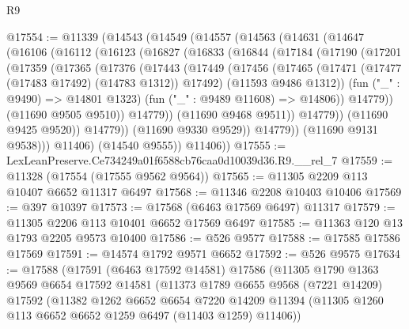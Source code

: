 \begin{lexlean}{R9}
\begin{coremodule}
@17554 := @11339
    (@14543
      (@14549
        (@14557
          (@14563
            (@14631
              (@14647
                (@16106
                  (@16112
                    (@16123
                      (@16827
                        (@16833
                          (@16844
                            (@17184
                              (@17190
                                (@17201
                                  (@17359
                                    (@17365
                                      (@17376
                                        (@17443
                                          (@17449
                                            (@17456
                                              (@17465
                                                (@17471
                                                  (@17477 (@17483 @17492) (@14783 @1312))
                                                  @17492)
                                                (@11593 @9486 @1312))
                                              (fun ("_" : @9490) => @14801 @1323)
                                              (fun ("_" : @9489 @11608) => @14806))
                                            @14779))
                                        (@11690 @9505 @9510))
                                      @14779))
                                  (@11690 @9468 @9511))
                                @14779))
                            (@11690 @9425 @9520))
                          @14779))
                      (@11690 @9330 @9529))
                    @14779))
                (@11690 @9131 @9538)))
            @11406)
          (@14540 @9555))
        @11406))
@17555 := LexLeanPreserve.Ce734249a01f6588cb76caa0d10039d36.R9.__rel_7
@17559 := @11328 (@17554 (@17555 @9562 @9564))
@17565 := @11305 @2209 @113 @10407 @6652 @11317 @6497
@17568 := @11346 @2208 @10403 @10406
@17569 := @397 @10397
@17573 := @17568 (@6463 @17569 @6497) @11317
@17579 := @11305 @2206 @113 @10401 @6652 @17569 @6497
@17585 := @11363 @120 @13 @1793 @2205 @9573 @10400
@17586 := @526 @9577
@17588 := @17585 @17586 @17569
@17591 := @14574 @1792 @9571 @6652
@17592 := @526 @9575
@17634 := @17588
    (@17591
      (@6463 @17592 @14581)
      @17586
      (@11305
        @1790
        @1363
        @9569
        @6654
        @17592
        @14581
        (@11373
          @1789
          @6655
          @9568
          (@7221 @14209)
          @17592
          (@11382
            @1262
            @6652
            @6654
            @7220
            @14209
            @11394
            (@11305 @1260 @113 @6652 @6652 @1259 @6497 (@11403 @1259) @11406))

\end{coremodule}
\end{lexlean}

